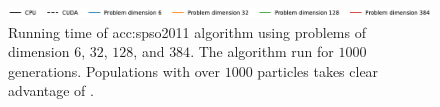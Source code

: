 \begin{figure}[ht!]
\begin{minipage}[t]{0.32\textwidth}
    \end{minipage}

    \begin{minipage}{\textwidth}
        \centering
        \includegraphics[width=\textwidth]{img/runs/time_pso2011_alldim_legend.pdf}
    \end{minipage}

    \caption[Running time of PSO2011]{Running time of \acrlong{acc:spso2011} algorithm using problems of dimension $6$, $32$, $128$, and $384$. The algorithm run for $1000$ generations. Populations with over $1000$ particles takes clear advantage of \gpu.}
    \label{meas:spso2011time}
\end{figure}

